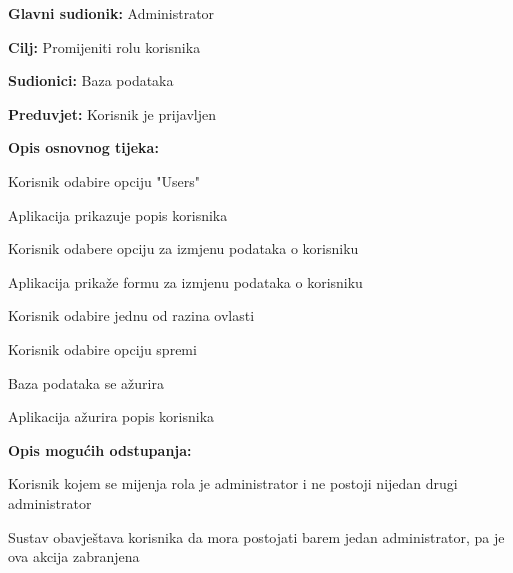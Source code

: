 					\noindent {}
					\begin{packed_item}

						\item \textbf{Glavni sudionik:} Administrator
						\item \textbf{Cilj:} Promijeniti rolu korisnika
						\item \textbf{Sudionici:} Baza podataka
						\item \textbf{Preduvjet:} Korisnik je prijavljen
						\item \textbf{Opis osnovnog tijeka:}

						\item[] \begin{packed_enum}

							\item Korisnik odabire opciju "Users"
							\item Aplikacija prikazuje popis korisnika
							\item Korisnik odabere opciju za izmjenu podataka o korisniku
							\item Aplikacija prikaže formu za izmjenu podataka o korisniku
							\item Korisnik odabire jednu od razina ovlasti
							\item Korisnik odabire opciju spremi
							\item Baza podataka se ažurira
							\item Aplikacija ažurira popis korisnika

						\end{packed_enum}

						\item \textbf{Opis mogućih odstupanja:}

						\item[] \begin{packed_item}

							\item[3.a] Korisnik kojem se mijenja rola je administrator i ne postoji nijedan
							drugi administrator
							\item[] \begin{packed_enum}

								\item Sustav obavještava korisnika da mora postojati
								barem jedan administrator, pa je ova akcija zabranjena

							\end{packed_enum}

						\end{packed_item}
					\end{packed_item}

